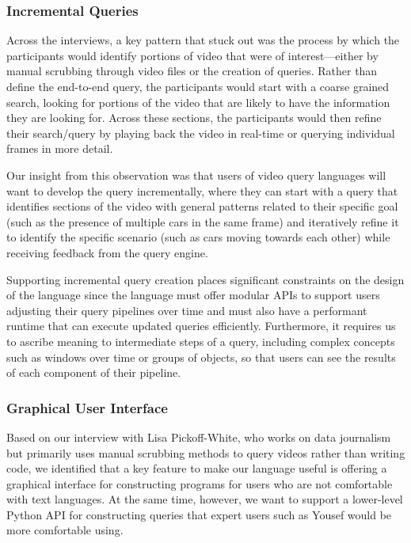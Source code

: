 \subsubsection{Incremental Queries}
Across the interviews, a key pattern that stuck out was the process by which the participants would identify portions of video that were of interest---either by manual scrubbing through video files or the creation of queries. Rather than define the end-to-end query, the participants would start with a coarse grained search, looking for portions of the video that are likely to have the information they are looking for. Across these sections, the participants would then refine their search/query by playing back the video in real-time or querying individual frames in more detail.

Our insight from this observation was that users of video query languages will want to develop the query incrementally, where they can start with a query that identifies sections of the video with general patterns related to their specific goal (such as the presence of multiple cars in the same frame) and iteratively refine it to identify the specific scenario (such as cars moving towards each other) while receiving feedback from the query engine.

Supporting incremental query creation places significant constraints on the design of the language since the language must offer modular APIs to support users adjusting their query pipelines over time and must also have a performant runtime that can execute updated queries efficiently. Furthermore, it requires us to ascribe meaning to intermediate steps of a query, including complex concepts such as windows over time or groups of objects, so that users can see the results of each component of their pipeline.

\subsubsection{Graphical User Interface}
Based on our interview with Lisa Pickoff-White, who works on data journalism but primarily uses manual scrubbing methods to query videos rather than writing code, we identified that a key feature to make our language useful is offering a graphical interface for constructing programs for users who are not comfortable with text languages. At the same time, however, we want to support a lower-level Python API for constructing queries that expert users such as Yousef would be more comfortable using.

